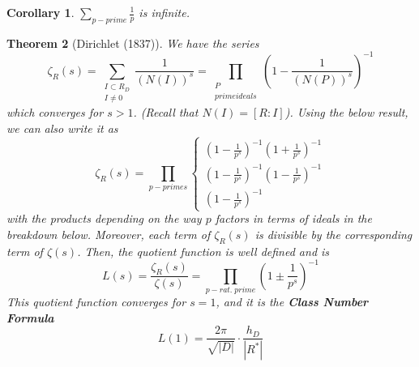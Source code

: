 \documentclass[12pt]{article}
\newtheorem{thm}{Theorem}[section]
\newtheorem{cor}[thm]{Corollary}
\theoremstyle{definition}
\theoremstyle{remark}
\numberwithin{equation}{section}
\newcommand\B[1]{\textbf{ #1}}
\begin{document}
\vspace{15pt}

\begin{cor}
        $\sum\limits_{p-prime}\frac{1}{p}$ is infinite.
\end{cor}


\vspace{15pt}

\begin{thm}[Dirichlet (1837)]
        We have the series \begin{equation}
                \zeta_R(s) = \sum\limits_{\begin{array}{c} I \subset R_D \\ I \neq 0\end{array}}\frac{1}{(N(I))^s} = \prod\limits_{\begin{array}{c}P \\ prime ideals\end{array}}\left(1 - \frac{1}{(N(P))^s}\right)^{-1} 
        \end{equation}
        which converges for $s > 1$. (Recall that $N(I) = [R:I]$). Using the below result, we can also write it as \begin{equation}
                \zeta_R(s) = \prod\limits_{p - primes}\left\{\begin{array}{c} \left(1 - \frac{1}{p^{s}}\right)^{-1}\left(1+\frac{1}{p^s}\right)^{-1} \\ \left(1 - \frac{1}{p^{s}}\right)^{-1}\left(1 - \frac{1}{p^{s}}\right)^{-1} \\ \left(1 - \frac{1}{p^{s}}\right)^{-1} \end{array}\right.
        \end{equation}
        with the products depending on the way $p$ factors in terms of ideals in the breakdown below. Moreover, each term of $\zeta_R(s)$ is divisible by the corresponding term of $\zeta(s)$. Then, the quotient function is well defined and is \begin{equation}
                L(s) = \frac{\zeta_R(s)}{\zeta(s)} = \prod\limits_{p-rat.\;prime}\left(1\pm \frac{1}{p^{s}}\right)^{-1}
        \end{equation}
        This quotient function converges for $s=1$, and it is the \B{Class Number Formula} \begin{equation}
                L(1) = \frac{2\pi}{\sqrt{|D|}}\cdot \frac{h_D}{|R^*|}
        \end{equation}
\end{thm}
\end{document}
